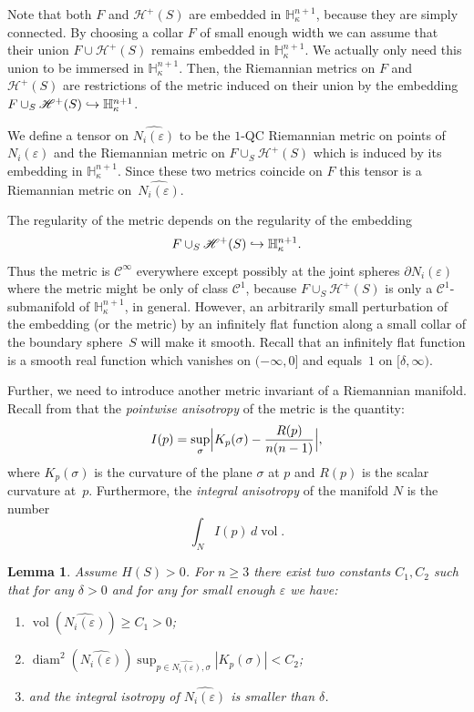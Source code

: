 \documentclass[JEP,XML,SOM,Unicode]{cedram}
\let\mathcal\mathscr
\DeclareMathOperator{\diam}{diam}
\DeclareMathOperator{\vol}{vol}
\newcommand\hto{\mathrel{\lhook\joinrel\to}}
\newtheorem{lemma}[theorem]{Lemma}
\theoremstyle{definition}
\theoremstyle{remark}
\numberwithin{equation}{section}
\begin{document}
Note that both $F$ and $\mathcal H^+(S)$ are embedded
in $\mathbb H_{\kappa}^{n+1}$, because they are simply connected. By choosing a collar $F$ of small enough width
we can assume that their union $F\cup \mathcal H^+(S)$ remains embedded in $\mathbb H_{\kappa}^{n+1}$. We actually only need
this union to be immersed in $\mathbb H_{\kappa}^{n+1}$. Then, the Riemannian metrics on $F$ and $\mathcal H^+(S)$
are restrictions of the metric induced on their union by the embedding
$F\cup_S \mathcal H^+(S)\hto \mathbb H_{\kappa}^{n+1}$.

We define a tensor on $\widehat{N_i(\varepsilon)}$ to be the $1$-QC Riemannian metric on points of
$N_i(\varepsilon)$ and the Riemannian metric on $F\cup_S \mathcal H^+(S)$ which is induced by its embedding in $\mathbb H_{\kappa}^{n+1}$.
Since these two metrics coincide on $F$ this tensor is a Riemannian metric on~$\widehat{N_i(\varepsilon)}$.

The regularity of the metric depends on the regularity of the embedding $$F\cup_S \mathcal H^+(S)\hto \mathbb H_{\kappa}^{n+1}.$$ Thus the metric is $\mathcal C^{\infty}$ everywhere except possibly at the joint spheres
$\partial N_i(\varepsilon)$ where the metric might be only of class $\mathcal C^1$, because
$F\cup_S \mathcal H^+(S)$ is only a $\mathcal C^1$-submanifold of $\mathbb H_{\kappa}^{n+1}$, in general.
However, an arbitrarily small perturbation of the embedding (or the metric)
by an infinitely flat function along a small collar of the boundary sphere~$S$ will make it smooth. Recall that an infinitely flat
function is a smooth real function which vanishes on $(-\infty, 0]$ and equals~$1$ on $[\delta, \infty)$.

Further, we need to introduce another metric invariant of a
Riemannian manifold. Recall from \cite{Nik} that the
\emph{pointwise anisotropy} of the metric is the quantity:
\[I(p)=\sup_{\sigma} \Bigl|K_p(\sigma)- \frac{R(p)}{n(n-1)}\Bigr|,\]
where $K_p(\sigma)$ is the curvature of the plane $\sigma$ at $p$
and $R(p)$ is the scalar curvature at~$p$. Furthermore, the
\emph{integral anisotropy} of the manifold $N$ is the number
\[\int_NI(p)\, d\vol.\]

\begin{lemma}\label{niko}
Assume $H(S) >0$.
For $n\geq3$ there exist two constants $C_1,C_2$ such that for any $\delta >0$
and for any for small enough $\varepsilon$ we have:
\begin{enumerate}
\item $\vol(\widehat{N_i(\varepsilon)}) \geq C_1 >0$;
\item $\diam^2(\widehat{N_i(\varepsilon)})\sup_{p\in \widehat{N_i(\varepsilon)}, \sigma}|K_p(\sigma)| < C_2$;
\item and the integral isotropy of $\widehat{N_i(\varepsilon)}$ is smaller than $\delta$.
\end{enumerate}
\end{lemma}
\end{document}
